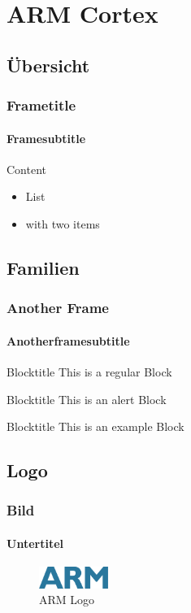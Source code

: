 \section{ARM Cortex}
\subsection{Übersicht}
\begin{frame}
    \frametitle{Frametitle}
    \framesubtitle{Framesubtitle}
    Content
    \begin{itemize}
        \item List
        \item with two items
    \end{itemize}
\end{frame}

\subsection{Familien}
\begin{frame}
    \frametitle{Another Frame}
    \framesubtitle{Anotherframesubtitle}
    \begin{block}{Blocktitle}
        This is a regular Block
    \end{block}
    \begin{alertblock}{Blocktitle}
        This is an alert Block
    \end{alertblock}
    \begin{exampleblock}{Blocktitle}
        This is an example Block
    \end{exampleblock}
\end{frame}

\subsection{Logo}
\begin{frame}
    \frametitle{Bild}
    \framesubtitle{Untertitel}
    \begin{figure}
        \includegraphics[width=0.2\textwidth]{fig/1280px-ARM_Logo.png}
        \caption{ARM Logo}
    \end{figure}
\end{frame}
